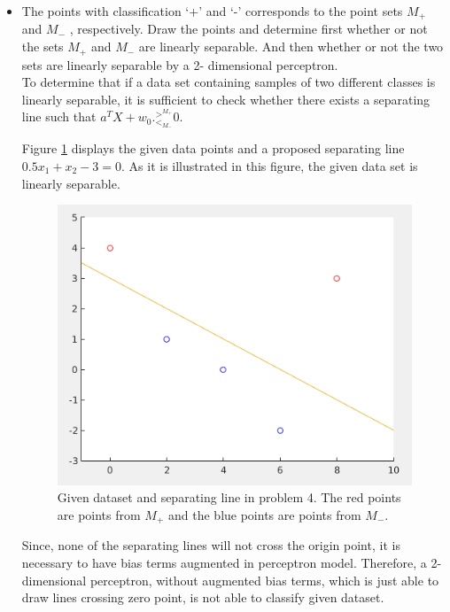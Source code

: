 \documentclass[12pt]{article}
\begin{document}
\begin{itemize}
\item  The points with classification ‘+’ and ‘-’ corresponds to the point sets $M_+$ and $M_-$ ,
respectively. Draw the points and determine first whether or not the sets $M_+$ and $M_-$ are linearly separable. And then whether or not the two sets are linearly separable by a 2-
dimensional perceptron.\\
To determine that if a data set containing samples of two different classes is linearly separable, it is sufficient to check whether there exists a separating line such that $a^TX + w_0 ._{<_{M_-}}^{>^{M_+}} 0$.

Figure \ref{fig:4-1} displays the given data points and a proposed separating line $0.5x_1 + x_2 - 3 = 0 $. As it is illustrated in this figure, the given data set is linearly separable.

\begin{figure}[h]
\centering
\includegraphics[scale=0.4]{Imgs/4-1.png}
\caption{Given dataset and separating line in problem 4. The red points are points from $M_+$ and the blue points are points from $M_-$.}
\label{fig:4-1}
\end{figure}

Since, none of the separating lines will not cross the origin point, it is necessary to have bias terms augmented in perceptron model. Therefore, a 2-dimensional perceptron, without augmented bias terms, which is just able to draw lines crossing zero point, is not able to classify given dataset.\\


\end{itemize}
\end{document}
